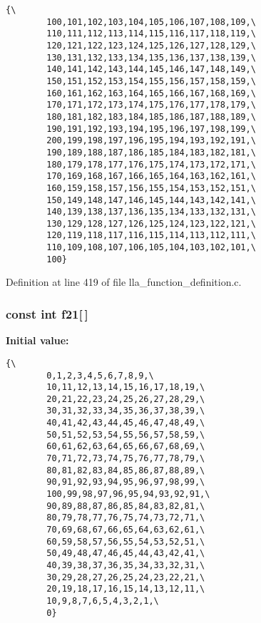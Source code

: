\footnotesize\begin{verbatim}{\
        100,101,102,103,104,105,106,107,108,109,\
        110,111,112,113,114,115,116,117,118,119,\
        120,121,122,123,124,125,126,127,128,129,\
        130,131,132,133,134,135,136,137,138,139,\
        140,141,142,143,144,145,146,147,148,149,\
        150,151,152,153,154,155,156,157,158,159,\
        160,161,162,163,164,165,166,167,168,169,\
        170,171,172,173,174,175,176,177,178,179,\
        180,181,182,183,184,185,186,187,188,189,\
        190,191,192,193,194,195,196,197,198,199,\
        200,199,198,197,196,195,194,193,192,191,\
        190,189,188,187,186,185,184,183,182,181,\
        180,179,178,177,176,175,174,173,172,171,\
        170,169,168,167,166,165,164,163,162,161,\
        160,159,158,157,156,155,154,153,152,151,\
        150,149,148,147,146,145,144,143,142,141,\
        140,139,138,137,136,135,134,133,132,131,\
        130,129,128,127,126,125,124,123,122,121,\
        120,119,118,117,116,115,114,113,112,111,\
        110,109,108,107,106,105,104,103,102,101,\
        100}
\end{verbatim}\normalsize 


Definition at line 419 of file lla\_\-function\_\-definition.c.
\subsubsection{\setlength{\rightskip}{0pt plus 5cm}const int {\bf f21}[$\,$]}\label{lla__function__definition_8c_a20}


{\bf Initial value:}

\footnotesize\begin{verbatim}{\
        0,1,2,3,4,5,6,7,8,9,\
        10,11,12,13,14,15,16,17,18,19,\
        20,21,22,23,24,25,26,27,28,29,\
        30,31,32,33,34,35,36,37,38,39,\
        40,41,42,43,44,45,46,47,48,49,\
        50,51,52,53,54,55,56,57,58,59,\
        60,61,62,63,64,65,66,67,68,69,\
        70,71,72,73,74,75,76,77,78,79,\
        80,81,82,83,84,85,86,87,88,89,\
        90,91,92,93,94,95,96,97,98,99,\
        100,99,98,97,96,95,94,93,92,91,\
        90,89,88,87,86,85,84,83,82,81,\
        80,79,78,77,76,75,74,73,72,71,\
        70,69,68,67,66,65,64,63,62,61,\
        60,59,58,57,56,55,54,53,52,51,\
        50,49,48,47,46,45,44,43,42,41,\
        40,39,38,37,36,35,34,33,32,31,\
        30,29,28,27,26,25,24,23,22,21,\
        20,19,18,17,16,15,14,13,12,11,\
        10,9,8,7,6,5,4,3,2,1,\
        0}
\end{verbatim}\normalsize 


